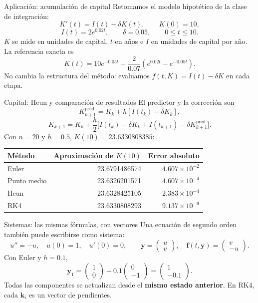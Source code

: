 \documentclass[aspectratio=169,12pt]{beamer}
\begin{document}
\begin{frame}{Aplicación: acumulación de capital}
Retomamos el modelo hipotético de la clase de integración:
\[K'(t)=I(t)-\delta K(t),\qquad K(0)=10,\]
\[I(t)=2e^{0.02t},\qquad\delta=0.05,\qquad0\leq t\leq10.\]
$K$ se mide en unidades de capital, $t$ en años e $I$ en unidades de capital por año.
La referencia exacta es
\[K(t)=10e^{-0.05t}+\frac{2}{0.07}\left(e^{0.02t}-e^{-0.05t}\right).\]
No cambia la estructura del método: evaluamos $f(t,K)=I(t)-\delta K$ en cada etapa.
\end{frame}

\begin{frame}{Capital: Heun y comparación de resultados}
El predictor y la corrección son
\[K_{k+1}^{\mathrm{pred}}=K_k+h[I(t_k)-\delta K_k],\]
\[K_{k+1}=K_k+\frac h2\bigl[I(t_k)-\delta K_k+
I(t_{k+1})-\delta K_{k+1}^{\mathrm{pred}}\bigr].\]
Con $n=20$ y $h=0.5$, $K(10)=23.6330808385$:
\begin{center}\small
\begin{tabular}{lrr}\toprule
Método&Aproximación de $K(10)$&Error absoluto\\\midrule
Euler&23.6791486574&$4.607\times10^{-2}$\\
Punto medio&23.6326201571&$4.607\times10^{-4}$\\
Heun&23.6328425105&$2.383\times10^{-4}$\\
RK4&23.6330808293&$9.137\times10^{-9}$\\\bottomrule
\end{tabular}\end{center}
\end{frame}

\begin{frame}{Sistemas: las mismas fórmulas, con vectores}
Una ecuación de segundo orden también puede escribirse como sistema:
\[u''=-u,\quad u(0)=1,\quad u'(0)=0,\qquad
\mathbf y=\begin{pmatrix}u\\v\end{pmatrix},\quad
\mathbf f(t,\mathbf y)=\begin{pmatrix}v\\-u\end{pmatrix}.\]
Con Euler y $h=0.1$,
\[\mathbf y_1=\begin{pmatrix}1\\0\end{pmatrix}
+0.1\begin{pmatrix}0\\-1\end{pmatrix}
=\begin{pmatrix}1\\-0.1\end{pmatrix}.\]
Todas las componentes se actualizan desde el \textbf{mismo estado anterior}.
En RK4, cada $\mathbf k_i$ es un vector de pendientes.
\end{frame}
\end{document}
